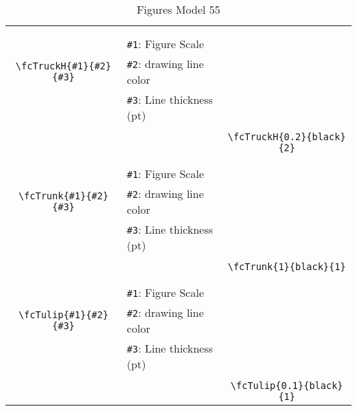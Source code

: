 \documentclass[x11names]{article}
\begin{document}
\begin{table}[H]
\begin{tabular}{|c|l|c|}
	&&\multirow{5}{*}{\fcTruckH{0.2}{black}{2}}\\	&&\\	&\verb|#1|: Figure Scale &\\	\verb|\fcTruckH{#1}{#2}{#3}|&	\verb|#2|: drawing line color &\\	&\verb|#3|: Line thickness (pt) &\\ &&\\&&	\verb|\fcTruckH{0.2}{black}{2}|\\\hline 	
	&&\multirow{5}{*}{\fcTrunk{1}{black}{1}}\\	&&\\	&\verb|#1|: Figure Scale &\\	\verb|\fcTrunk{#1}{#2}{#3}|&	\verb|#2|: drawing line color &\\	&\verb|#3|: Line thickness (pt) &\\ &&\\&&	\verb|\fcTrunk{1}{black}{1}|\\\hline 	
	&&\multirow{5}{*}{\fcTulip{0.1}{black}{1}}\\	&&\\	&\verb|#1|: Figure Scale &\\	\verb|\fcTulip{#1}{#2}{#3}|&	\verb|#2|: drawing line color &\\	&\verb|#3|: Line thickness (pt) &\\ &&\\&&	\verb|\fcTulip{0.1}{black}{1}|\\\hline 	\hline\end{tabular}\caption{Figures Model 55}\label{tab55}\end{table}
\end{document}
